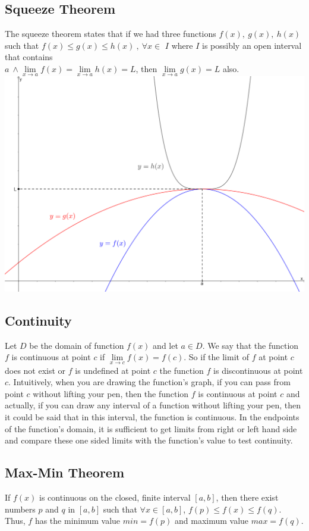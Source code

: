 \documentclass[12pt]{article}
\begin{document}
\subsection{Squeeze Theorem}
The squeeze theorem states that if we had three functions $f(x),\ g(x),\ h(x)$ such that $f(x)\leq g(x) \leq h(x) \ ,\ \forall x \in$ $I$ where $I$ is possibly an open interval that contains \\ $a\ \wedge \lim \limits_{x \to a} f(x) = \lim \limits_{x \to a} h(x)=L $, then $\lim \limits_{x \to a} g(x)=L $ also.\\
\includegraphics[scale=0.2]{Squeeze.png}
\subsection{Continuity}
Let $D$ be the domain of function $f(x)$ and let $a\in D$. We say that the function $f$ is continuous at point $c$ if $\lim \limits_{x \to c} f(x)= f(c)$. So if the limit of $f$ at point $c$ does not exist or $f$ is undefined at point $c$ the function $f$ is discontinuous at point $c$. Intuitively, when you are drawing the function's graph, if you can pass from point $c$ without lifting your pen, then the function $f$ is continuous at point $c$ and actually, if you can draw any interval of a function without lifting your pen, then it could be said that in this interval, the function is continuous. In the endpoints of the function's domain, it is sufficient to get limits from right or left hand side and compare these one sided limits with the function's value to test continuity.
\newpage
\subsection{Max-Min Theorem}
If $f(x)$ is continuous on the closed, finite interval $[a,b]$, then there exist numbers $p$ and $q$ in $[a,b]$ such that $\forall  x \in [a,b]$, $f(p)\leq f(x)\leq f(q)$. Thus, $f$ has the minimum value $min=f(p)$ and maximum value $max=f(q)$.
\end{document}
